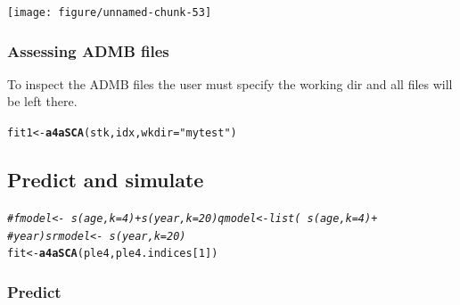 \documentclass[a4paper,english,10pt]{article}\usepackage[]{graphicx}\usepackage[]{color}
\makeatletter
\newcommand{\hlnum}[1]{\textcolor[rgb]{0.686,0.059,0.569}{#1}}%
\newcommand{\hlstr}[1]{\textcolor[rgb]{0.192,0.494,0.8}{#1}}%
\newcommand{\hlcom}[1]{\textcolor[rgb]{0.678,0.584,0.686}{\textit{#1}}}%
\newcommand{\hlstd}[1]{\textcolor[rgb]{0.345,0.345,0.345}{#1}}%
\newcommand{\hlkwb}[1]{\textcolor[rgb]{0.69,0.353,0.396}{#1}}%
\newcommand{\hlkwc}[1]{\textcolor[rgb]{0.333,0.667,0.333}{#1}}%
\newcommand{\hlkwd}[1]{\textcolor[rgb]{0.737,0.353,0.396}{\textbf{#1}}}%
\newenvironment{kframe}{%
 \def\at@end@of@kframe{}%
 \ifinner\ifhmode%
  \def\at@end@of@kframe{\end{minipage}}%
  \begin{minipage}{\columnwidth}%
 \fi\fi%
 \def\FrameCommand##1{\hskip\@totalleftmargin \hskip-\fboxsep
 \colorbox{shadecolor}{##1}\hskip-\fboxsep
     \hskip-\linewidth \hskip-\@totalleftmargin \hskip\columnwidth}%
 \MakeFramed {\advance\hsize-\width
   \@totalleftmargin\z@ \linewidth\hsize
   \@setminipage}}%
 {\par\unskip\endMakeFramed%
 \at@end@of@kframe}
\newenvironment{knitrout}{}{} %
\makeatother
\begin{document}
\begin{knitrout}
\color{fgcolor}

{\centering \texttt{[image: figure/unnamed-chunk-53]} 

}



\end{knitrout}


\subsubsection{Assessing ADMB files}

To inspect the ADMB files the user must specify the working dir and all files will be left there.

\begin{knitrout}
\color{fgcolor}\begin{kframe}
\begin{alltt}
\hlstd{fit1} \hlkwb{<-} \hlkwd{a4aSCA}\hlstd{(stk, idx,} \hlkwc{wkdir} \hlstd{=} \hlstr{"mytest"}\hlstd{)}
\end{alltt}


{\ttfamily\noindent\bfseries\color{errorcolor}{\#\# Error: error in evaluating the argument 'indices' in selecting a method for function 'a4aSCA': Error: object 'idx' not found}}\end{kframe}
\end{knitrout}


\subsection{Predict and simulate}

\begin{knitrout}
\color{fgcolor}\begin{kframe}
\begin{alltt}
\hlcom{# fmodel <- ~ s(age, k=4) + s(year, k = 20) qmodel <- list( ~ s(age, k=4) +}
\hlcom{# year) srmodel <- ~s(year, k=20)}
\hlstd{fit} \hlkwb{<-} \hlkwd{a4aSCA}\hlstd{(ple4, ple4.indices[}\hlnum{1}\hlstd{])}
\end{alltt}
\end{kframe}
\end{knitrout}


\subsubsection{Predict}
\end{document}

